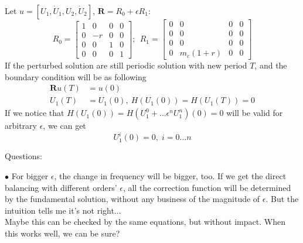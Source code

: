 \documentclass{article}
\begin{document}
Let $u=[U_1,\dot{U}_1,U_2,\dot{U}_2]$, $\mathbf{R}=R_0+\epsilon R_1$:
\begin{equation}
    R_0=\begin{bmatrix}
    1 & 0  & 0 & 0\\
    0 & -r & 0 & 0\\
    0 & 0  & 1 & 0\\
    0 & 0  & 0 & 1
    \end{bmatrix};~~
    R_1=\begin{bmatrix}
    0 & 0  & 0 & 0\\
    0 & 0  & 0 & 0\\
    0 & 0  & 0 & 0\\
    0 & m_c (1+r)   & 0 & 0
    \end{bmatrix}
\end{equation}
If the perturbed solution are still periodic solution with new period $T$, and the boundary condition will be as following
%
\begin{align}
\label{eq:perturbed reset map}
    \mathbf{R} u(T) & = u(0)\\
    U_1(T) &=U_1(0),~H(U_1(0))=H(U_1(T))=0
\end{align}
If we notice that $H(U_1(0))=H(U_1^0+\ldots \epsilon^n U_1^n)(0)=0$ will be valid for arbitrary $\epsilon$, we can get 
\begin{equation}
U_1^i(0)=0,\;i=0\ldots n
\label{eq: Fisrt BQ}
\end{equation}

Questions:

$\bullet$ For bigger $\epsilon$, the change in frequency will be bigger, too. If we get the direct balancing with different orders' $\epsilon$, all the correction function will be determined by the fundamental solution, without any business of the magnitude of $\epsilon$. But the intuition tells me it's not right... \\Maybe this can be checked by the same equations, but without impact. When this works well, we can be sure?\\
\end{document}
